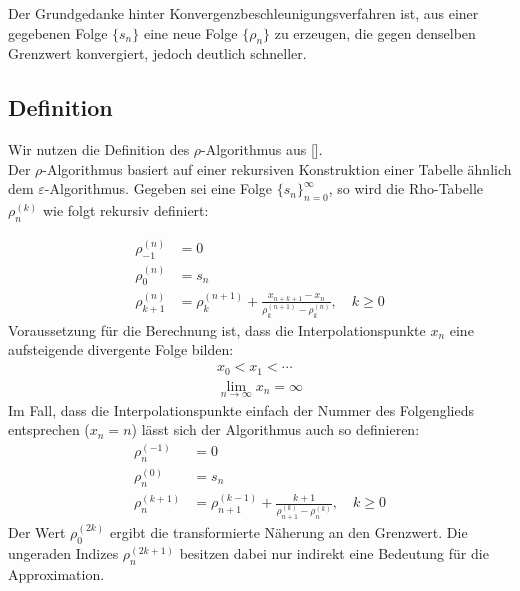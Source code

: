 \documentclass[a4paper,12pt]{article}
\numberwithin{equation}{section}
\theoremstyle{remark}
\begin{document}
Der Grundgedanke hinter Konvergenzbeschleunigungsverfahren ist, aus einer gegebenen Folge $\{s_n\}$ eine neue Folge $\{\rho_n\}$ zu erzeugen, die gegen denselben Grenzwert konvergiert, jedoch deutlich schneller.

\subsection{Definition}\label{subsec:def}
Wir nutzen die Definition des $\rho$-Algorithmus aus [\cite[34-35]{weniger1996nonlinear}].\\
Der $\rho$-Algorithmus basiert auf einer rekursiven Konstruktion einer Tabelle ähnlich dem $\varepsilon$-Algorithmus. Gegeben sei eine Folge $\{s_n\}_{n=0}^{\infty}$, so wird die Rho-Tabelle $\rho^{(k)}_n$ wie folgt rekursiv definiert:

\begin{align}
\rho^{(n)}_{-1} &= 0 \quad\\
\rho^{(n)}_0 &= s_n \\
\rho^{(n)}_{k+1} &= \rho^{(n+1)}_{k} + \frac{x_{n+k+1}-x_{n}}{\rho^{(n+1)}_{k} - \rho^{(n)}_k}, \quad k \ge 0 \label{eq:rhodef}
\end{align}
Voraussetzung für die Berechnung ist, dass die Interpolationspunkte $x_n$ eine aufsteigende divergente Folge bilden:
\begin{gather*}
x_0<x_1<\cdots\\
\lim_{n\rightarrow\infty}x_{n}=\infty
\end{gather*}
Im Fall, dass die Interpolationspunkte einfach der Nummer des Folgenglieds entsprechen ($x_n = n$) lässt sich der Algorithmus auch so definieren:
\begin{align}
\rho^{(-1)}_n &= 0 \quad\\
\rho^{(0)}_n &= s_n \\
\rho^{(k+1)}_n &= \rho^{(k-1)}_{n+1} + \frac{k+1}{\rho^{(k)}_{n+1} - \rho^{(k)}_n}, \quad k \ge 0 \label{eq:rho_rek}
\end{align}
Der Wert $\rho^{(2k)}_0$ ergibt die transformierte Näherung an den Grenzwert. Die ungeraden Indizes $\rho^{(2k+1)}_n$ besitzen dabei nur indirekt eine Bedeutung für die Approximation.
\end{document}
